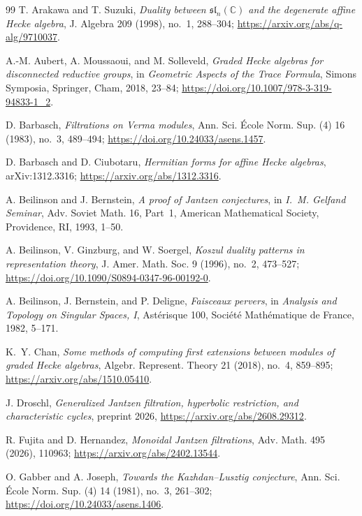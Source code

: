 \documentclass[11pt]{amsart}
\theoremstyle{definition}
\theoremstyle{remark}
\begin{document}
\footnotesize
\begin{thebibliography}{99}
T. Arakawa and T. Suzuki,
\emph{Duality between $\mathfrak{sl}_n(\mathbb C)$ and the degenerate affine
Hecke algebra}, J. Algebra 209 (1998), no.~1, 288--304;
\url{https://arxiv.org/abs/q-alg/9710037}.

A.-M. Aubert, A. Moussaoui, and M. Solleveld,
\emph{Graded Hecke algebras for disconnected reductive groups},
in \emph{Geometric Aspects of the Trace Formula}, Simons Symposia,
Springer, Cham, 2018, 23--84;
\url{https://doi.org/10.1007/978-3-319-94833-1_2}.

D. Barbasch, \emph{Filtrations on Verma modules},
Ann. Sci. \'{E}cole Norm. Sup. (4) 16 (1983), no.~3, 489--494;
\url{https://doi.org/10.24033/asens.1457}.

D. Barbasch and D. Ciubotaru, \emph{Hermitian forms for affine Hecke algebras},
arXiv:1312.3316;
\url{https://arxiv.org/abs/1312.3316}.

A. Beilinson and J. Bernstein, \emph{A proof of Jantzen conjectures},
in \emph{I.~M. Gelfand Seminar}, Adv. Soviet Math. 16, Part~1,
American Mathematical Society, Providence, RI, 1993, 1--50.

A. Beilinson, V. Ginzburg, and W. Soergel,
\emph{Koszul duality patterns in representation theory},
J. Amer. Math. Soc. 9 (1996), no.~2, 473--527;
\url{https://doi.org/10.1090/S0894-0347-96-00192-0}.

A. Beilinson, J. Bernstein, and P. Deligne,
\emph{Faisceaux pervers}, in \emph{Analysis and Topology on Singular Spaces,
I}, Ast\'erisque 100, Soci\'et\'e Math\'ematique de France, 1982, 5--171.

K.~Y. Chan, \emph{Some methods of computing first extensions between modules
of graded Hecke algebras}, Algebr. Represent. Theory 21 (2018), no.~4,
859--895;
\url{https://arxiv.org/abs/1510.05410}.

J. Droschl, \emph{Generalized Jantzen filtration, hyperbolic restriction, and characteristic cycles}, preprint 2026, \url{https://arxiv.org/abs/2608.29312}.

R. Fujita and D. Hernandez, \emph{Monoidal Jantzen filtrations},
Adv. Math. 495 (2026), 110963;
\url{https://arxiv.org/abs/2402.13544}.

O. Gabber and A. Joseph, \emph{Towards the Kazhdan--Lusztig conjecture},
Ann. Sci. \'{E}cole Norm. Sup. (4) 14 (1981), no.~3, 261--302;
\url{https://doi.org/10.24033/asens.1406}.


\end{thebibliography}
\end{document}
